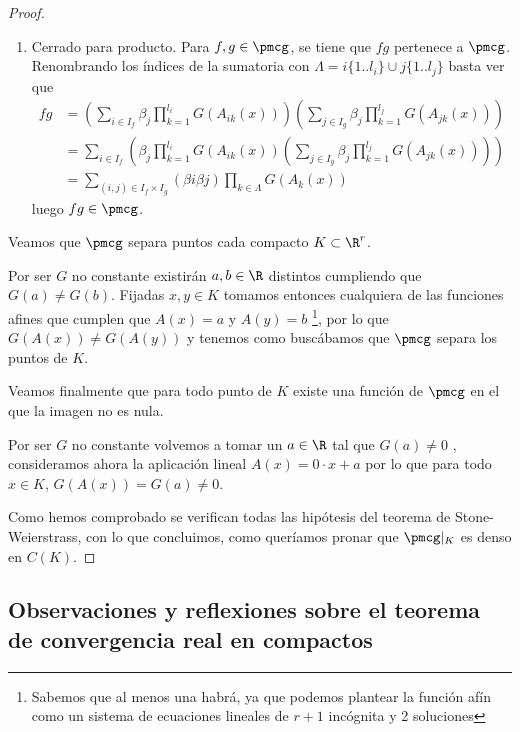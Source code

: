 \begin{proof}
\begin{enumerate}
        \item Cerrado para producto. Para $f,g \in \pmcg$, se tiene que $fg$ pertenece a $\pmcg$. 
        Renombrando los índices de la sumatoria con $\Lambda = i\{1..l_i\} \cup j\{1..l_j\}$ basta ver que 
        \begin{equation}
            \begin{split}
                fg &= \left(\sum_{i \in I_f} \beta_{j}  \prod_{k=1}^{l_{i}}  G(A_{ik}(x))\right)
                    \left(\sum_{j \in I_g}   \beta_{j}  \prod_{k=1}^{l_{j}} G(A_{jk}(x)) \right) \\
                    & = \sum_{i \in I_f} \left(  \beta_{j}  \prod_{k=1}^{l_{i}}  G(A_{ik}(x))
                        \left( \sum_{j \in I_g}  \beta_{j} \prod_{k=1}^{l_{j}} G(A_{jk}(x))  \right)  
                     \right) \\
                    & =  \sum_{(i,j) \in I_f \times I_g} (\beta{i}\beta{j}) \prod_{k \in \Lambda} G(A_{k}(x))
            \end{split}
        \end{equation}
        luego $fg \in \pmcg$. 
    \end{enumerate}

    Veamos que $\pmcg$ separa puntos cada compacto $K \subset \R^r$. 

    Por ser $G$ no constante existirán $a,b \in \R$ distintos cumpliendo que $G(a) \neq G(b)$. Fijadas $x,y \in K$ tomamos entonces cualquiera de las 
    funciones afines que cumplen que $A(x) = a$ y $A(y)=b$ 
    \footnote{Sabemos que al menos una habrá, ya que podemos plantear la función afín
    como un sistema de ecuaciones lineales de $r+1$ incógnita y 2 soluciones}, 
    por lo que $G(A(x)) \neq G(A(y))$ y tenemos como buscábamos que $\pmcg$ separa los puntos de $K$. 

    Veamos finalmente que para todo punto de $K$ existe una función de $\pmcg$  en el que la imagen no es nula.  

    Por ser $G$ no constante volvemos a tomar un $a \in \R$ tal que $G(a) \neq 0$ , consideramos ahora la aplicación lineal
    $A(x) = 0 \cdot x + a$ por lo que para todo $x \in K$, $G(A(x)) = G(a) \neq 0$. 

    Como hemos comprobado se verifican todas las hipótesis del teorema de Stone-Weierstrass, con lo que concluimos, como queríamos pronar que $\pmcg |_K$ es denso en $C(K). $ 
\end{proof}

\subsection{Observaciones y reflexiones sobre el teorema de convergencia real en compactos}


